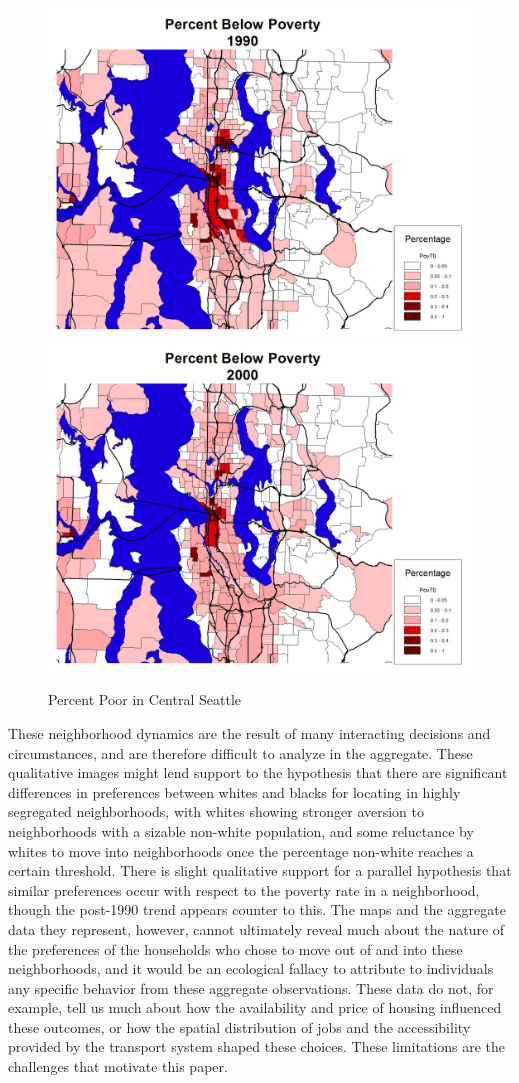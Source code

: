\documentclass[12pt,a4paper]{article}
\begin{document}
\begin{figure}[h]
\centerline{
 \includegraphics[width=.45\textwidth,height=0.35\textwidth]
 {pctpoor1990.jpg} \hspace{1cm}
 \includegraphics[width=.45\textwidth,height=0.35\textwidth]
 {pctpoor2000.jpg}}
\caption{\label{fig:pctpoor} Percent Poor in Central Seattle}
\end{figure}

These neighborhood dynamics are the result of many interacting
decisions and circumstances, and are therefore difficult to
analyze in the aggregate.  These qualitative images might lend
support to the hypothesis that there are significant differences
in preferences between whites and blacks for locating in highly
segregated neighborhoods, with whites showing stronger aversion to
neighborhoods with a sizable non-white population, and some
reluctance by whites to move into neighborhoods once the
percentage non-white reaches a certain threshold.  There is slight
qualitative support for a parallel hypothesis that similar
preferences occur with respect to the poverty rate in a
neighborhood, though the post-1990 trend appears counter to this.
The maps and the aggregate data they represent, however, cannot
ultimately reveal much about the nature of the preferences of the
households who chose to move out of and into these neighborhoods,
and it would be an ecological fallacy to attribute to individuals
any specific behavior from these aggregate observations. These
data do not, for example, tell us much about how the availability
and price of housing influenced these outcomes, or how the spatial
distribution of jobs and the accessibility provided by the
transport system shaped these choices.  These limitations are the
challenges that motivate this paper.
\end{document}
